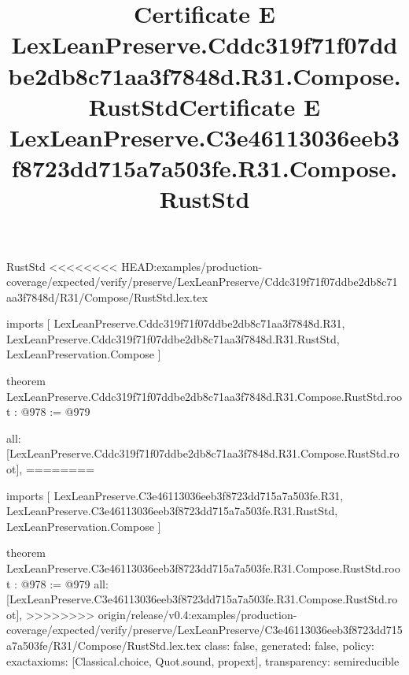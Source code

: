 \begin{lexlean}{RustStd}
<<<<<<<< HEAD:examples/production-coverage/expected/verify/preserve/LexLeanPreserve/Cddc319f71f07ddbe2db8c71aa3f7848d/R31/Compose/RustStd.lex.tex
\title{Certificate E LexLeanPreserve.Cddc319f71f07ddbe2db8c71aa3f7848d.R31.Compose.RustStd}
\begin{coremodule}
imports [
  LexLeanPreserve.Cddc319f71f07ddbe2db8c71aa3f7848d.R31,
  LexLeanPreserve.Cddc319f71f07ddbe2db8c71aa3f7848d.R31.RustStd,
  LexLeanPreservation.Compose
]

theorem LexLeanPreserve.Cddc319f71f07ddbe2db8c71aa3f7848d.R31.Compose.RustStd.root : @978 := @979 {
  all: [LexLeanPreserve.Cddc319f71f07ddbe2db8c71aa3f7848d.R31.Compose.RustStd.root],
========
\title{Certificate E LexLeanPreserve.C3e46113036eeb3f8723dd715a7a503fe.R31.Compose.RustStd}
\begin{coremodule}
imports [
  LexLeanPreserve.C3e46113036eeb3f8723dd715a7a503fe.R31,
  LexLeanPreserve.C3e46113036eeb3f8723dd715a7a503fe.R31.RustStd,
  LexLeanPreservation.Compose
]

theorem LexLeanPreserve.C3e46113036eeb3f8723dd715a7a503fe.R31.Compose.RustStd.root : @978 := @979 {
  all: [LexLeanPreserve.C3e46113036eeb3f8723dd715a7a503fe.R31.Compose.RustStd.root],
>>>>>>>> origin/release/v0.4:examples/production-coverage/expected/verify/preserve/LexLeanPreserve/C3e46113036eeb3f8723dd715a7a503fe/R31/Compose/RustStd.lex.tex
  class: false,
  generated: false,
  policy: exact{axioms: [Classical.choice, Quot.sound, propext]},
  transparency: semireducible
}


\end{coremodule}}
\end{coremodule}
\end{lexlean}
